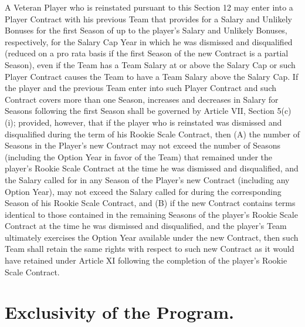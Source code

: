 \documentclass[
]{book}
\begin{document}
\begin{enumerate}
\begin{enumerate}
    A Veteran Player who is reinstated pursuant to this Section 12 may enter into a Player Contract with his previous Team that provides for a Salary and Unlikely Bonuses for the first Season of up to the player's Salary and Unlikely Bonuses, respectively, for the Salary Cap Year in which he was dismissed and disqualified (reduced on a pro rata basis if the first Season of the new Contract is a partial Season), even if the Team has a Team Salary at or above the Salary Cap or such Player Contract causes the Team to have a Team Salary above the Salary Cap. If the player and the previous Team enter into such Player Contract and such Contract covers more than one Season, increases and decreases in Salary for Seasons following the first Season shall be governed by Article VII, Section 5(c)(i); provided, however, that if the player who is reinstated was dismissed and disqualified during the term of his Rookie Scale Contract, then (A) the number of Seasons in the Player's new Contract may not exceed the number of Seasons (including the Option Year in favor of the Team) that remained under the player's Rookie Scale Contract at the time he was dismissed and disqualified, and the Salary called for in any Season of the Player's new Contract (including any Option Year), may not exceed the Salary called for during the corresponding Season of his Rookie Scale Contract, and (B) if the new Contract contains terms identical to those contained in the remaining Seasons of the player's Rookie Scale Contract at the time he was dismissed and disqualified, and the player's Team ultimately exercises the Option Year available under the new Contract, then such Team shall retain the same rights with respect to such new Contract as it would have retained under Article XI following the completion of the player's Rookie Scale Contract.
  \end{enumerate}
\end{enumerate}

\hypertarget{exclusivity-of-the-program.}{%
\section{Exclusivity of the Program.}\label{exclusivity-of-the-program.}}
\end{document}
